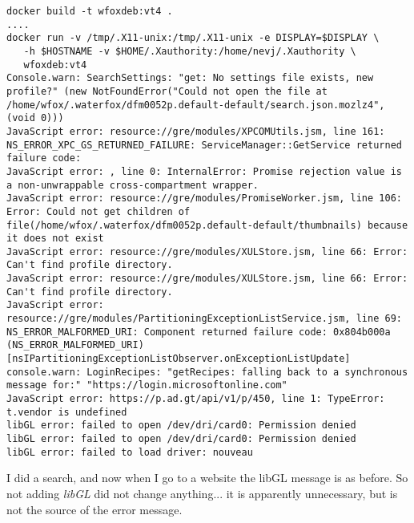 \documentclass[a4paper]{article}  %
\begin{document}
\begin{tcolorbox}
\begin{verbatim}
docker build -t wfoxdeb:vt4 .
....
docker run -v /tmp/.X11-unix:/tmp/.X11-unix -e DISPLAY=$DISPLAY \
   -h $HOSTNAME -v $HOME/.Xauthority:/home/nevj/.Xauthority \
   wfoxdeb:vt4
Console.warn: SearchSettings: "get: No settings file exists, new profile?" (new NotFoundError("Could not open the file at /home/wfox/.waterfox/dfm0052p.default-default/search.json.mozlz4", (void 0)))
JavaScript error: resource://gre/modules/XPCOMUtils.jsm, line 161: NS_ERROR_XPC_GS_RETURNED_FAILURE: ServiceManager::GetService returned failure code:
JavaScript error: , line 0: InternalError: Promise rejection value is a non-unwrappable cross-compartment wrapper.
JavaScript error: resource://gre/modules/PromiseWorker.jsm, line 106: Error: Could not get children of file(/home/wfox/.waterfox/dfm0052p.default-default/thumbnails) because it does not exist
JavaScript error: resource://gre/modules/XULStore.jsm, line 66: Error: Can't find profile directory.
JavaScript error: resource://gre/modules/XULStore.jsm, line 66: Error: Can't find profile directory.
JavaScript error: resource://gre/modules/PartitioningExceptionListService.jsm, line 69: NS_ERROR_MALFORMED_URI: Component returned failure code: 0x804b000a (NS_ERROR_MALFORMED_URI) [nsIPartitioningExceptionListObserver.onExceptionListUpdate]
console.warn: LoginRecipes: "getRecipes: falling back to a synchronous message for:" "https://login.microsoftonline.com"
JavaScript error: https://p.ad.gt/api/v1/p/450, line 1: TypeError: t.vendor is undefined
libGL error: failed to open /dev/dri/card0: Permission denied
libGL error: failed to open /dev/dri/card0: Permission denied
libGL error: failed to load driver: nouveau
\end{verbatim}
\end{tcolorbox}
I did a search, and now when I go to a website the libGL message is as before. So not adding {\em libGL} did not change anything... it is apparently unnecessary, but is not the source of the error message.  
\end{document}

